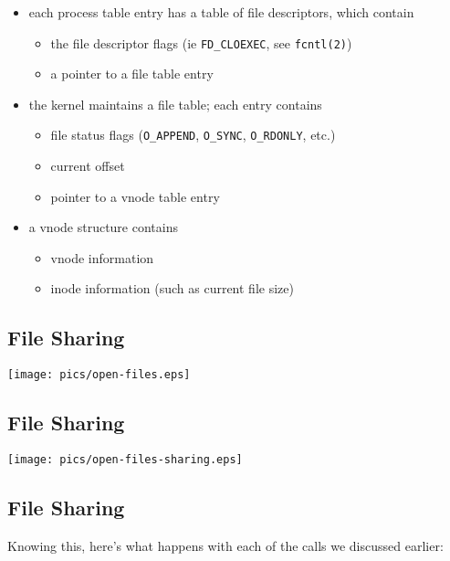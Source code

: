 \documentclass[xga]{xdvislides}
\begin{document}
\begin{itemize}
	\item each process table entry has a table of file descriptors, which
		contain
		\begin{itemize}
			\item the file descriptor flags (ie {\tt FD\_CLOEXEC}, see \verb+fcntl(2)+)
			\item a pointer to a file table entry
		\end{itemize}
	\item the kernel maintains a file table;  each entry contains
		\begin{itemize}
			\item file status flags (\verb+O_APPEND+, \verb+O_SYNC+, \verb+O_RDONLY+, etc.)
			\item current offset
			\item pointer to a vnode table entry
		\end{itemize}
	\item a vnode structure contains
		\begin{itemize}
			\item vnode information
			\item inode information (such as current file size)
		\end{itemize}
\end{itemize}

\subsection{File Sharing}
\begin{center}
\texttt{[image: pics/open-files.eps]} \\
\end{center}

\subsection{File Sharing}
\begin{center}
\texttt{[image: pics/open-files-sharing.eps]} \\
\end{center}


\subsection{File Sharing}
Knowing this, here's what happens with each of the calls we discussed earlier:
\end{document}
